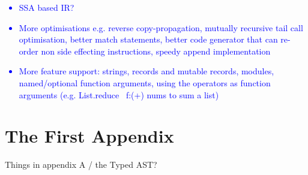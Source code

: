 \documentclass[12pt,twoside,notitlepage]{report}
\newcommand\note[1]{\textcolor{blue}{#1}}
\begin{document}
\note{
	\begin{itemize}
		\item SSA based IR?
		\item More optimisations e.g. reverse copy-propagation, mutually recursive tail call optimisation, better match statements, better code generator that can re-order non side effecting instructions, speedy append implementation
		\item More feature support: strings, records and mutable records, modules, named/optional function arguments, using the operators as function arguments (e.g. List.reduce ~f:(+) nums to sum a list)
	\end{itemize}
}





\clearpage


\printbibliography[title={Bibliography}]
\clearpage

\appendix

\chapter{The First Appendix}

Things in appendix A / the Typed AST?


\clearpage
\end{document}
